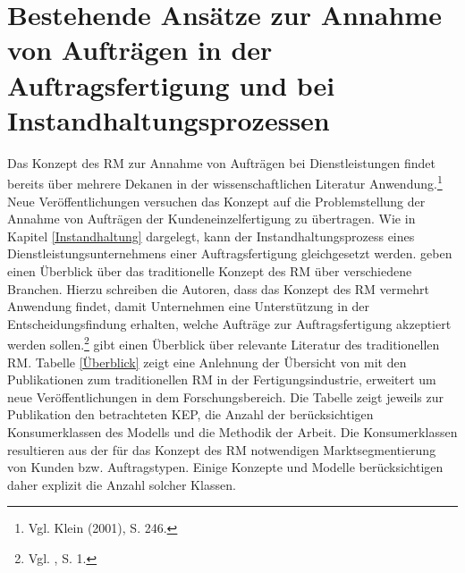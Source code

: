 \chapter{Bestehende Ansätze zur Annahme von Aufträgen in der Auftragsfertigung und bei Instandhaltungsprozessen}\label{Review}
\setcounter{footnote}{54}  %

Das Konzept des RM zur Annahme von Aufträgen bei Dienstleistungen findet bereits über mehrere Dekanen in der wissenschaftlichen Literatur Anwendung.\footnote{Vgl. Klein (2001), S. 246.} Neue Veröffentlichungen versuchen das Konzept auf die Problemstellung der Annahme von Aufträgen der Kundeneinzelfertigung zu übertragen. Wie in Kapitel \ref{Instandhaltung} dargelegt, kann der Instandhaltungsprozess eines Dienstleistungsunternehmens einer Auftragsfertigung gleichgesetzt werden. \cite{kimms2005revenue} geben einen Überblick über das traditionelle Konzept des RM über verschiedene Branchen. Hierzu schreiben die Autoren, dass das Konzept des RM vermehrt Anwendung findet, damit Unternehmen eine Unterstützung in der Entscheidungsfindung erhalten, welche Aufträge zur Auftragsfertigung akzeptiert werden sollen.\footnote{Vgl. \cite{kimms2005revenue}, S. 1.} \cite{quante2009management} gibt einen Überblick über relevante Literatur des traditionellen RM. Tabelle \ref{Überblick} zeigt eine Anlehnung der Übersicht von \cite{quante2009management} mit den Publikationen zum traditionellen RM in der Fertigungsindustrie, erweitert um neue Veröffentlichungen in dem Forschungsbereich. Die Tabelle zeigt jeweils zur Publikation den betrachteten KEP, die Anzahl der berücksichtigen Konsumerklassen des Modells und die Methodik der Arbeit. Die Konsumerklassen resultieren aus der für das Konzept des RM notwendigen Marktsegmentierung von Kunden bzw. Auftragstypen. Einige Konzepte und Modelle berücksichtigen daher explizit die Anzahl solcher Klassen.

